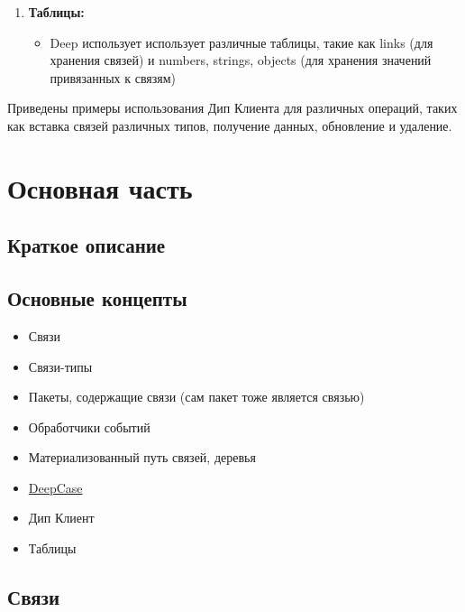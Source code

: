 \documentclass{article}
\begin{document}
\begin{enumerate}
  \item \textbf{Таблицы:}
        \begin{itemize}
          \item Deep использует использует различные таблицы, такие как links
                (для хранения связей) и numbers, strings, objects (для хранения
                значений
                привязанных к связям)
        \end{itemize}
\end{enumerate}

Приведены примеры использования Дип Клиента для различных операций, таких как
вставка связей различных типов, получение данных, обновление и удаление.


\tableofcontents

\section{Основная часть}

\subsection{Краткое описание}

\subsection{Основные концепты}

\begin{itemize}
  \item Связи
  \item Связи-типы
  \item Пакеты, содержащие связи (сам пакет тоже является связью)
  \item Обработчики событий
  \item Материализованный путь связей, деревья
  \item \hyperlink{DeepCase.Def}{DeepCase}
  \item Дип Клиент
  \item Таблицы
\end{itemize}

\subsection{Связи}
\end{document}
